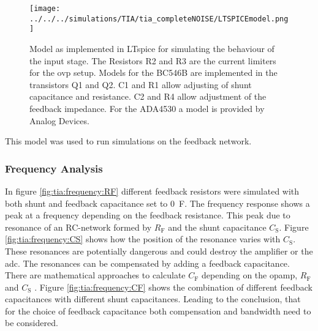 \begin{figure}
	\centering
	\texttt{[image: ../../../simulations/TIA/tia\_completeNOISE/LTSPICEmodel.png]}
	\caption{Model as implemented in LTspice for simulating the behaviour of the input stage. The Resistors R2 and R3 are the current limiters for the \ac{ovp} setup. Models for the BC546B are implemented in the transistors Q1 and Q2. C1 and R1 allow adjusting of shunt capacitance and resistance. C2 and R4 allow adjustment of the feedback impedance. For the ADA4530 a model is provided by Analog Devices.}
	\label{fig:tia:ltspicemodel}
\end{figure}
This model was used to run simulations on the feedback network.
\subsubsection*{Frequency Analysis}
In figure \ref{fig:tia:frequency:RF} different feedback resistors were simulated with both shunt and feedback capacitance set to \SI{0}{\farad}. The frequency response shows a peak at a frequency depending on the feedback resistance. This peak due to resonance of an RC-network formed by $R_\text{F}$ and the shunt capacitance $C_\text{S}$.
Figure \ref{fig:tia:frequency:CS} shows how the position of the resonance varies with $C_\text{S}$. These resonances are potentially dangerous and could destroy the amplifier or the \ac{adc}. The resonances can be compensated by adding a feedback capacitance. There are mathematical approaches to calculate $C_\text{F}$ depending on the \ac{opamp}, $R_\text{F}$ and $C_\text{S}$ \cite{tia_compensate}.
Figure \ref{fig:tia:frequency:CF} shows the combination of different feedback capacitances with different shunt capacitances. Leading to the conclusion, that for the choice of feedback capacitance both compensation and bandwidth need to be considered.
